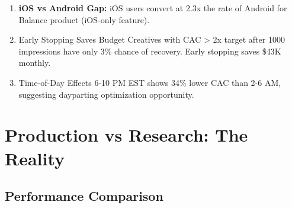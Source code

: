 \documentclass[11pt,a4paper]{report}
\begin{document}
\begin{enumerate}[leftmargin=*]
    \item \begin{warningbox}
    \textbf{iOS vs Android Gap:} iOS users convert at 2.3x the rate of Android for Balance product (iOS-only feature).
    \end{warningbox}

    \item \begin{insightbox}{Early Stopping Saves Budget}
    Creatives with CAC > 2x target after 1000 impressions have only 3\% chance of recovery. Early stopping saves \$43K monthly.
    \end{insightbox}

    \item \begin{insightbox}{Time-of-Day Effects}
    6-10 PM EST shows 34\% lower CAC than 2-6 AM, suggesting dayparting optimization opportunity.
    \end{insightbox}
\end{enumerate}

\section{Production vs Research: The Reality}

\subsection{Performance Comparison}
\end{document}
